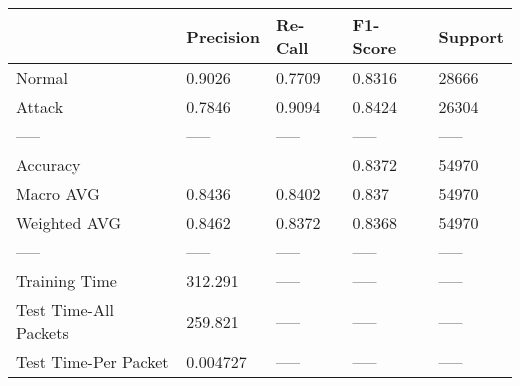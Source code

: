 \begin{tabular}{lllll}
\toprule
{} & Precision & Re-Call & F1-Score & Support \\
\midrule
Normal                &    0.9026 &  0.7709 &   0.8316 &   28666 \\
Attack                &    0.7846 &  0.9094 &   0.8424 &   26304 \\
-----                 &     ----- &   ----- &    ----- &   ----- \\
Accuracy              &           &         &   0.8372 &   54970 \\
Macro AVG             &    0.8436 &  0.8402 &    0.837 &   54970 \\
Weighted AVG          &    0.8462 &  0.8372 &   0.8368 &   54970 \\
-----                 &     ----- &   ----- &    ----- &   ----- \\
Training Time         &   312.291 &   ----- &    ----- &   ----- \\
Test Time-All Packets &   259.821 &   ----- &    ----- &   ----- \\
Test Time-Per Packet  &  0.004727 &   ----- &    ----- &   ----- \\
\bottomrule
\end{tabular}
